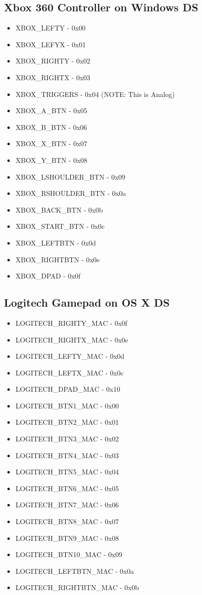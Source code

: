 \documentclass[11pt]{article} %
\begin{document}
\newpage

\subsection{Xbox 360 Controller on Windows DS}

\begin{itemize}
\item XBOX\_LEFTY - 0x00
\item XBOX\_LEFYX - 0x01
\item XBOX\_RIGHTY - 0x02
\item XBOX\_RIGHTX - 0x03
\item XBOX\_TRIGGERS - 0x04 (NOTE: This is Analog)
\item XBOX\_A\_BTN - 0x05
\item XBOX\_B\_BTN - 0x06
\item XBOX\_X\_BTN - 0x07
\item XBOX\_Y\_BTN - 0x08
\item XBOX\_LSHOULDER\_BTN - 0x09
\item XBOX\_RSHOULDER\_BTN - 0x0a
\item XBOX\_BACK\_BTN - 0x0b
\item XBOX\_START\_BTN - 0x0c
\item XBOX\_LEFTBTN - 0x0d
\item XBOX\_RIGHTBTN - 0x0e
\item XBOX\_DPAD - 0x0f
\end{itemize}

\newpage

\subsection{Logitech Gamepad on OS X DS}

\begin{itemize}
\item LOGITECH\_RIGHTY\_MAC - 0x0f
\item LOGITECH\_RIGHTX\_MAC - 0x0e
\item LOGITECH\_LEFTY\_MAC - 0x0d
\item LOGITECH\_LEFTX\_MAC - 0x0c
\item LOGITECH\_DPAD\_MAC - 0x10
\item LOGITECH\_BTN1\_MAC - 0x00
\item LOGITECH\_BTN2\_MAC - 0x01
\item LOGITECH\_BTN3\_MAC - 0x02
\item LOGITECH\_BTN4\_MAC - 0x03
\item LOGITECH\_BTN5\_MAC - 0x04
\item LOGITECH\_BTN6\_MAC - 0x05
\item LOGITECH\_BTN7\_MAC - 0x06
\item LOGITECH\_BTN8\_MAC - 0x07
\item LOGITECH\_BTN9\_MAC - 0x08
\item LOGITECH\_BTN10\_MAC - 0x09
\item LOGITECH\_LEFTBTN\_MAC - 0x0a
\item LOGITECH\_RIGHTBTN\_MAC - 0x0b
\end{itemize}
\end{document}

